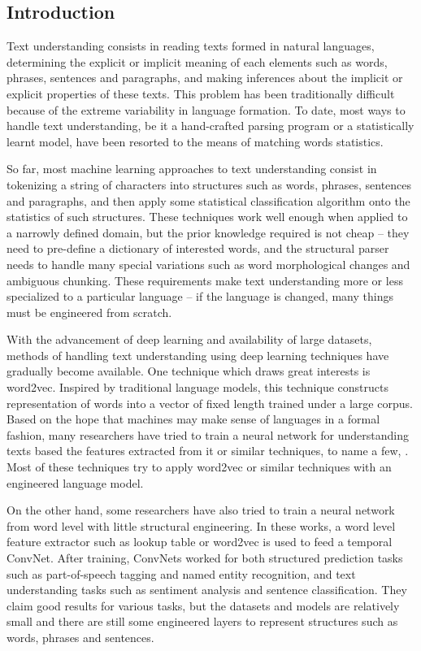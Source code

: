 \documentclass{article}
\begin{document}
\begin{CJK}{UTF8}{gbsn}
\section{Introduction}
\label{sect:intro}

Text understanding consists in reading texts formed in natural languages, determining the explicit or implicit meaning of each elements such as words, phrases, sentences and paragraphs, and making inferences about the implicit or explicit properties of these texts\cite{N87}. This problem has been traditionally difficult because of the extreme variability in language formation\cite{L82}. To date,  most ways to handle text understanding, be it a hand-crafted parsing program or a statistically learnt model, have been resorted to the means of matching words statistics.

So far, most machine learning approaches to text understanding consist in tokenizing a string of characters into structures such as words, phrases, sentences and paragraphs, and then apply some statistical classification algorithm onto the statistics of such structures\cite{S01}. These techniques work well enough when applied to a narrowly defined domain, but the prior knowledge required is not cheap -- they need to pre-define a dictionary of interested words, and the structural parser needs to handle many special variations such as word morphological changes and ambiguous chunking. These requirements make text understanding more or less specialized to a particular language -- if the language is changed, many things must be engineered from scratch.

With the advancement of deep learning and availability of large datasets, methods of handling text understanding using deep learning techniques have gradually become available. One technique which draws great interests is word2vec\cite{MSCCD13}. Inspired by traditional language models, this technique constructs representation of words into a vector of fixed length trained under a large corpus. Based on the hope that machines may make sense of languages in a formal fashion, many researchers have tried to train a neural network for understanding texts based the features extracted from it or similar techniques, to name a few, \cite{FCGSBDM13}\cite{GHYD13}\cite{LM14}\cite{MLS13}\cite{PSM14}. Most of these techniques try to apply word2vec or similar techniques with an engineered language model.

On the other hand, some researchers have also tried to train a neural network from word level with little structural engineering\cite{CWB11}\cite{K14}\cite{JZ14}\cite{SG14}. In these works, a word level feature extractor such as lookup table\cite{CWB11} or word2vec\cite{MSCCD13} is used to feed a temporal ConvNet\cite{LBBH98}. After training, ConvNets worked for both structured prediction tasks such as  part-of-speech tagging and named entity recognition, and text understanding tasks such as sentiment analysis and sentence classification. They claim good results for various tasks, but the datasets and models are relatively small and there are still some engineered layers to represent structures such as words, phrases and sentences.


\end{CJK}
\end{document}
